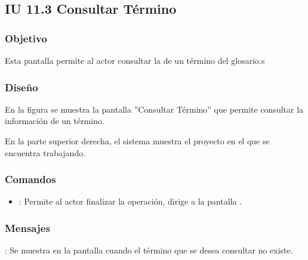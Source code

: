 \subsection{IU 11.3 Consultar Término}

\subsubsection{Objetivo}
	Esta pantalla permite al actor consultar la de un término del glosario.s
\subsubsection{Diseño}
	En la figura  se muestra la pantalla ''Consultar Término'' que permite consultar la información de un término.
	
	En la parte superior derecha, el sistema muestra el proyecto en el que se encuentra trabajando.

\subsubsection{Comandos}
\begin{itemize}
	\item {}: Permite al actor finalizar la operación, dirige a la pantalla .
\end{itemize}

\subsubsection{Mensajes}

\begin{Citemize}
	\item {}: Se muestra en la pantalla  cuando el término que se desea consultar no existe.
\end{Citemize}
